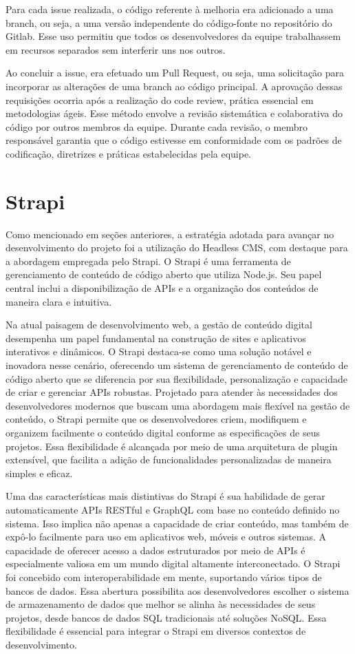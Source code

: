 Para cada issue realizada, o código referente à melhoria era adicionado a uma branch, ou seja, a uma versão independente do código-fonte no repositório do Gitlab. Esse uso permitiu que todos os desenvolvedores da equipe trabalhassem em recursos separados sem interferir uns nos outros.

Ao concluir a issue, era efetuado um Pull Request, ou seja, uma solicitação para incorporar as alterações de uma branch ao código principal. A aprovação dessas requisições ocorria após a realização do code review, prática essencial em metodologias ágeis. Esse método envolve a revisão sistemática e colaborativa do código por outros membros da equipe. Durante cada revisão, o membro responsável garantia que o código estivesse em conformidade com os padrões de codificação, diretrizes e práticas estabelecidas pela equipe.

\section{Strapi}
Como mencionado em seções anteriores, a estratégia adotada para avançar no desenvolvimento do projeto foi a utilização do Headless CMS, com destaque para a abordagem empregada pelo Strapi. O Strapi é uma ferramenta de gerenciamento de conteúdo de código aberto que utiliza Node.js. Seu papel central inclui a disponibilização de APIs e a organização dos conteúdos de maneira clara e intuitiva.

Na atual paisagem de desenvolvimento web, a gestão de conteúdo digital desempenha um papel fundamental na construção de sites e aplicativos interativos e dinâmicos. O Strapi destaca-se como uma solução notável e inovadora nesse cenário, oferecendo um sistema de gerenciamento de conteúdo de código aberto que se diferencia por sua flexibilidade, personalização e capacidade de criar e gerenciar APIs robustas. Projetado para atender às necessidades dos desenvolvedores modernos que buscam uma abordagem mais flexível na gestão de conteúdo, o Strapi permite que os desenvolvedores criem, modifiquem e organizem facilmente o conteúdo digital conforme as especificações de seus projetos. Essa flexibilidade é alcançada por meio de uma arquitetura de plugin extensível, que facilita a adição de funcionalidades personalizadas de maneira simples e eficaz.

Uma das características mais distintivas do Strapi é sua habilidade de gerar automaticamente APIs RESTful e GraphQL com base no conteúdo definido no sistema. Isso implica não apenas a capacidade de criar conteúdo, mas também de expô-lo facilmente para uso em aplicativos web, móveis e outros sistemas. A capacidade de oferecer acesso a dados estruturados por meio de APIs é especialmente valiosa em um mundo digital altamente interconectado. O Strapi foi concebido com interoperabilidade em mente, suportando vários tipos de bancos de dados. Essa abertura possibilita aos desenvolvedores escolher o sistema de armazenamento de dados que melhor se alinha às necessidades de seus projetos, desde bancos de dados SQL tradicionais até soluções NoSQL. Essa flexibilidade é essencial para integrar o Strapi em diversos contextos de desenvolvimento.

